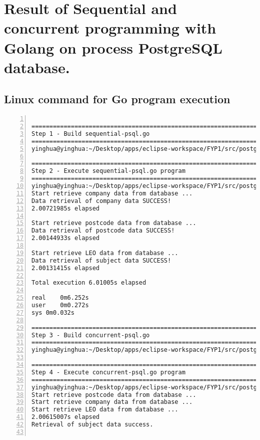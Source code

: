 \chapter{Result of Sequential and concurrent programming with Golang on process PostgreSQL database.} 
\label{AppendixG} 


\section {Linux command for Go program execution}

\lstset{basicstyle=\ttfamily\tiny}  
\begin{lstlisting}[breaklines, frame=single, numbers=left, caption={Linux command for Go program execution}, label=commandline-02]

================================================================
Step 1 - Build sequential-psql.go 
================================================================
yinghua@yinghua:~/Desktop/apps/eclipse-workspace/FYP1/src/postgres-process$ go build sequential-psql.go

================================================================
Step 2 - Execute sequential-psql.go program
================================================================
yinghua@yinghua:~/Desktop/apps/eclipse-workspace/FYP1/src/postgres-process$ time go run sequential-psql.go
Start retrieve company data from database ...
Data retrieval of company data SUCCESS!
2.00721985s elapsed

Start retrieve postcode data from database ...
Data retrieval of postcode data SUCCESS!
2.00144933s elapsed

Start retrieve LEO data from database ...
Data retrieval of subject data SUCCESS!
2.00131415s elapsed

Total execution 6.01005s elapsed

real	0m6.252s
user	0m0.272s
sys	0m0.032s

================================================================
Step 3 - Build concurrent-psql.go
================================================================
yinghua@yinghua:~/Desktop/apps/eclipse-workspace/FYP1/src/postgres-process$ go build concurrent-psql.go

================================================================
Step 4 - Execute concurrent-psql.go program 
================================================================
yinghua@yinghua:~/Desktop/apps/eclipse-workspace/FYP1/src/postgres-process$ time go run concurrent-psql.go
Start retrieve postcode data from database ...
Start retrieve company data from database ...
Start retrieve LEO data from database ...
2.00615007s elapsed
Retrieval of subject data success.


\end{lstlisting}

